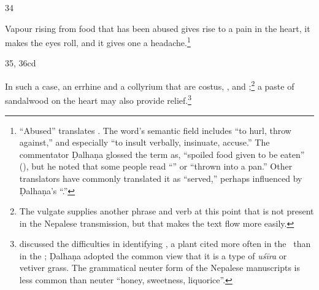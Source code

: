 \begin{translation}
\item[34]

Vapour rising from food that has been abused gives rise to a pain in the heart,
it makes the eyes roll, and it gives one a headache.\footnote{ “Abused” translates
.  The word's semantic field includes “to hurl, throw against,” and
especially “to insult verbally, insinuate, accuse.”  The commentator Ḍalhaṇa
glossed the term as, “spoiled food given to be eaten” (), but he noted that some people read “” or
“thrown into a pan.”  Other translators have commonly translated it as “served,” perhaps
influenced by Ḍalhaṇa's “.”}


\item[35, 36cd] 

In such a case, an errhine and a collyrium that are costus, ,  and ;\footnote{The vulgate 
    supplies another phrase and verb at this point that is not present in the Nepalese 
    transmission, but that makes the text flow more easily.}  a paste of sandalwood
on the heart may also provide relief.\footnote{\citet[350]{sing-1972} discussed
the difficulties in identifying , a plant cited more often in the
\SS\ than in the \CS; Ḍalhaṇa adopted the common view that it is a type of \emph{uśīra} or 
vetiver grass.  The grammatical neuter form 
  of the Nepalese
manuscripts is less common than neuter  “honey, sweetness,
liquorice”.}
 
    \end{translation}